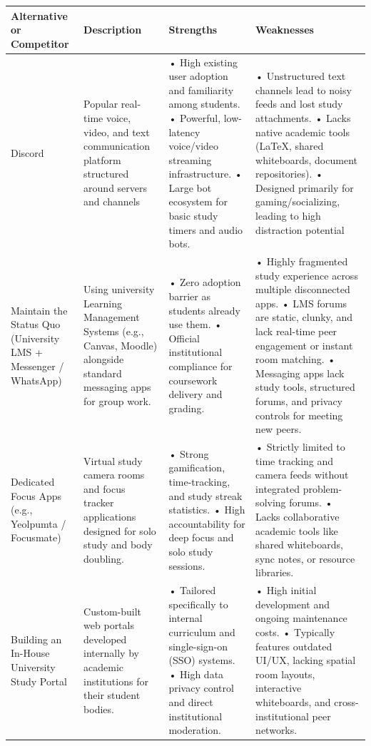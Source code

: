 \documentclass[12pt]{article}
\begin{document}
\begin{longtable}{|>{\raggedright\arraybackslash}p{}|>{\raggedright\arraybackslash}p{}|>{\raggedright\arraybackslash}p{}|>{\raggedright\arraybackslash}p{}|}
\hline
Alternative or Competitor & Description & Strengths & Weaknesses \\ \hline
\endhead
Discord & Popular real-time voice, video, and text communication platform structured around servers and channels & • High existing user adoption and familiarity among students. \newline{} • Powerful, low-latency voice/\allowbreak{}video streaming infrastructure. \newline{} • Large bot ecosystem for basic study timers and audio bots. & • Unstructured text channels lead to noisy feeds and lost study attachments. \newline{} • Lacks native academic tools (LaTeX, shared whiteboards, document repositories). \newline{} • Designed primarily for gaming/\allowbreak{}socializing, leading to high distraction potential \\ \hline
Maintain the Status Quo (University LMS + Messenger /\allowbreak{} WhatsApp) & Using university Learning Management Systems (e.g., Canvas, Moodle) alongside standard messaging apps for group work. & • Zero adoption barrier as students already use them. \newline{} • Official institutional compliance for coursework delivery and grading. & • Highly fragmented study experience across multiple disconnected apps. \newline{} • LMS forums are static, clunky, and lack real-time peer engagement or instant room matching. \newline{} • Messaging apps lack study tools, structured forums, and privacy controls for meeting new peers. \\ \hline
Dedicated Focus Apps (e.g., Yeolpumta /\allowbreak{} Focusmate) & Virtual study camera rooms and focus tracker applications designed for solo study and body doubling. & • Strong gamification, time-tracking, and study streak statistics. \newline{}  • High accountability for deep focus and solo study sessions. & • Strictly limited to time tracking and camera feeds without integrated problem-solving forums. \newline{} • Lacks collaborative academic tools like shared whiteboards, sync notes, or resource libraries. \\ \hline
Building an In-House University Study Portal & Custom-built web portals developed internally by academic institutions for their student bodies. & • Tailored specifically to internal curriculum and single-sign-on (SSO) systems. \newline{} • High data privacy control and direct institutional moderation. & • High initial development and ongoing maintenance costs. \newline{} • Typically features outdated UI/\allowbreak{}UX, lacking spatial room layouts, interactive whiteboards, and cross-institutional peer networks. \\ \hline
\end{longtable}
\end{document}
